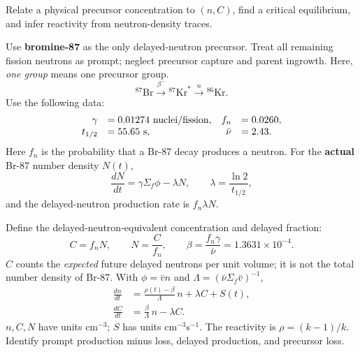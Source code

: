 \documentclass[compact]{ne630handout}
\begin{document}
{Relate a physical precursor concentration to $(n,C)$, find a critical equilibrium,
and infer reactivity from neutron-density traces.}

\begin{handoutflow}

Use \textbf{bromine-87} as the only delayed-neutron precursor.
Treat all remaining fission neutrons as prompt; neglect precursor capture
and parent ingrowth. Here, \emph{one group} means one precursor group.
\[
 {}^{87}\mathrm{Br}\xrightarrow{\beta^-}{}^{87}\mathrm{Kr}^{*}
       \xrightarrow{n}{}^{86}\mathrm{Kr}.
\]
Use the following data:
\[
 \begin{array}{rlrl}
 \gamma&=0.01274\ {\rm nuclei/fission},&
 f_n&=0.0260,\\
 t_{1/2}&=55.65\ {\rm s},&
 \bar\nu&=2.43.
 \end{array}
\]
Here $f_n$ is the probability that a Br-87 decay produces a neutron.
For the \textbf{actual} Br-87 number density $N(t)$,
\[
 \frac{dN}{dt}=\gamma\Sigma_f\phi-\lambda N,
 \qquad \lambda=\frac{\ln 2}{t_{1/2}},
\]
and the delayed-neutron production rate is $f_n\lambda N$.


Define the delayed-neutron-equivalent concentration and delayed fraction:
\[
 \boxed{C=f_nN,\qquad N=\frac{C}{f_n}},\qquad
 \beta=\frac{f_n\gamma}{\bar\nu}=1.3631\times10^{-4}.
\]
$C$ counts the \emph{expected} future delayed neutrons per unit volume;
it is not the total number density of Br-87.
With $\phi=\bar v n$ and $\Lambda=(\bar\nu\Sigma_f\bar v)^{-1}$,
\begin{equation*}
 \boxed{\begin{aligned}
 \frac{dn}{dt}&=\frac{\rho(t)-\beta}{\Lambda}\,n+\lambda C+S(t),\\
 \frac{dC}{dt}&=\frac{\beta}{\Lambda}\,n-\lambda C .
 \end{aligned}}
\end{equation*}
$n,C,N$ have units cm$^{-3}$; $S$ has units cm$^{-3}$s$^{-1}$.
The reactivity is $\rho=(k-1)/k$.
Identify prompt production minus loss, delayed production, and precursor loss.



\end{handoutflow}
\end{document}
